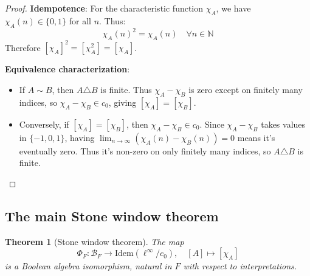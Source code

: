 \documentclass[11pt]{article}
\newtheorem{theorem}{Theorem}[section]
\theoremstyle{definition}
\theoremstyle{remark}
\newcommand{\N}{\mathbb{N}}
\newcommand{\cnull}{c_0}
\newcommand{\linf}{\ell^\infty}
\begin{document}
\begin{proof}
\textbf{Idempotence}: For the characteristic function \(\chi_A\), we have \(\chi_A(n) \in \{0,1\}\) for all \(n\). Thus:
\[\chi_A(n)^2 = \chi_A(n) \quad \forall n \in \N\]
Therefore \([\chi_A]^2 = [\chi_A^2] = [\chi_A]\).

\textbf{Equivalence characterization}: 
\begin{itemize}
\item If \(A \sim B\), then \(A \triangle B\) is finite. Thus \(\chi_A - \chi_B\) is zero except on finitely many indices, so \(\chi_A - \chi_B \in \cnull\), giving \([\chi_A] = [\chi_B]\).

\item Conversely, if \([\chi_A] = [\chi_B]\), then \(\chi_A - \chi_B \in \cnull\). Since \(\chi_A - \chi_B\) takes values in \(\{-1, 0, 1\}\), having \(\lim_{n \to \infty} (\chi_A(n) - \chi_B(n)) = 0\) means it's eventually zero. Thus it's non-zero on only finitely many indices, so \(A \triangle B\) is finite.
\end{itemize}
\end{proof}

\subsection{The main Stone window theorem}\label{ssec:stone-main}

\begin{theorem}[Stone window theorem]\label{thm:stone-window}
The map 
\[
 \Phi_F: \mathcal B_F \to \mathrm{Idem}(\linf/\cnull), \quad [A] \mapsto [\chi_A]
\]
is a Boolean algebra isomorphism, natural in \(F\) with respect to interpretations.
\end{theorem}
\end{document}
